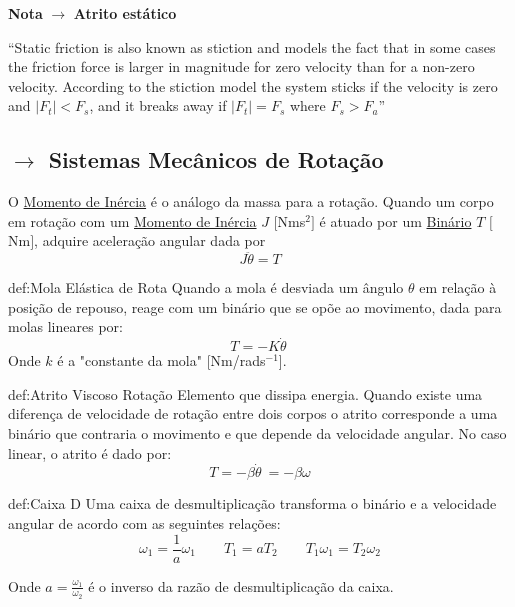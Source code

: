 \begin{mdframed}
\textbf{Nota} $\rightarrow$ \textbf{Atrito estático} 

\noindent 
``Static friction is also known as stiction and models the fact that in some cases the friction
force is larger in magnitude for zero velocity than for a non-zero velocity. According to
the stiction model the system sticks if the velocity is zero and $|F_t | < F_s$, and it breaks
away if $|F_t | = F_s$ where $F_s > F_a$''\cite{Egeland2002}
\end{mdframed}

\clearpage
\subsection[3.2 Sistemas Mecânicos de Rotação]{$\rightarrow$ Sistemas Mecânicos de Rotação}
\label{sec:mechanics-rotation}

O \underline{Momento de Inércia} é o análogo da massa para a rotação. Quando um corpo em rotação com um \underline{Momento de Inércia} $J$ $[$Nms$^{2}]$ é atuado por um \underline{Binário} $T$ $[$Nm$]$, adquire aceleração angular dada por
$$
    \boxed{J\ddot{\theta} = T}
$$


\begin{theo}{def:Mola Elástica de Rota}\label{def:MolaElasticaRota}
Quando a mola é desviada um ângulo $\theta$  em relação à posição de repouso, reage
com um binário que se opõe ao movimento, dada para molas lineares por:
$$
    T = -K\dot{\theta}\ 
$$
Onde $k$ é a "constante da mola" [Nm/rads$^{-1}$].
\end{theo}

\begin{theo}{def:Atrito Viscoso Rotação}\label{def:AtritoViscosoRotação}
Elemento que dissipa energia. Quando existe uma diferença de velocidade de rotação entre dois corpos o atrito corresponde a uma binário que contraria o movimento e que depende da velocidade angular. No caso linear, o atrito é dado por:
$$
    T = -\beta\dot{\theta}\ = -\beta \omega
$$
\end{theo}

\begin{theo}{def:Caixa D}\label{def:Caixa D}
Uma caixa de desmultiplicação transforma o binário e a velocidade angular de acordo com as seguintes relações:
$$
    \omega_1 = \frac{1}{a}\omega_1\qquad
    T_1 = aT_2\qquad
    T_1 \omega_1 = T_2 \omega_2
$$

Onde $a = \frac{\omega_1}{\omega_2}$ é o inverso da razão de desmultiplicação da caixa.
\end{theo}




